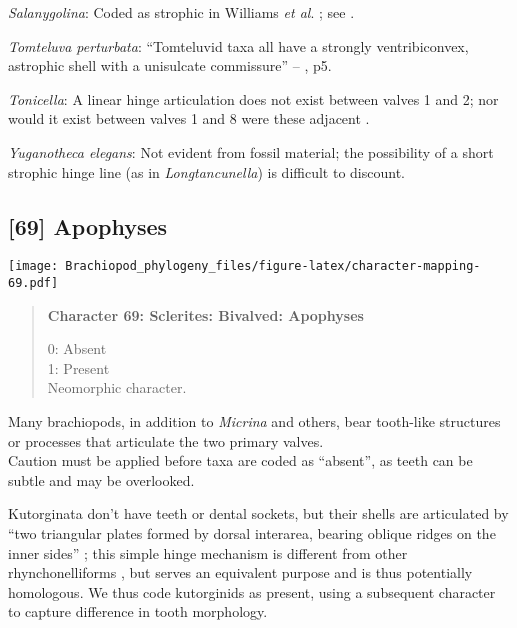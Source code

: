 \documentclass[openany]{book}
\theoremstyle{definition}
\theoremstyle{definition}
\theoremstyle{definition}
\theoremstyle{remark}
\begin{document}
\hypertarget{Salanygolina-coding-68}{}
\emph{Salanygolina}: Coded as strophic in Williams \emph{et al}.
\citeyearpar{Williams1998Thediversity}; see
\citet{Holmer2009Theenigmatic}.

\hypertarget{Tomteluva_perturbata-coding-68}{}
\emph{Tomteluva perturbata}: ``Tomteluvid taxa all have a strongly
ventribiconvex, astrophic shell with a unisulcate commissure'' --
\citet{Streng2016Anew}, p5.

\hypertarget{Tonicella-coding-68}{}
\emph{Tonicella}: A linear hinge articulation does not exist between
valves 1 and 2; nor would it exist between valves 1 and 8 were these
adjacent \citep{Connors2012}.

\hypertarget{Yuganotheca_elegans-coding-68}{}
\emph{Yuganotheca elegans}: Not evident from fossil material; the
possibility of a short strophic hinge line (as in \emph{Longtancunella})
is difficult to discount.

\subsection*{{[}69{]} Apophyses}\label{apophyses}

\texttt{[image: Brachiopod\_phylogeny\_files/figure-latex/character-mapping-69.pdf]}

\begin{quote}
\textbf{Character 69: Sclerites: Bivalved: Apophyses}

0: Absent\\
1: Present\\
Neomorphic character.
\end{quote}

Many brachiopods, in addition to \emph{Micrina} and others, bear
tooth-like structures or processes that articulate the two primary
valves.\\
Caution must be applied before taxa are coded as ``absent'', as teeth
can be subtle and may be overlooked.

Kutorginata don't have teeth or dental sockets, but their shells are
articulated by ``two triangular plates formed by dorsal interarea,
bearing oblique ridges on the inner sides''
\citep[p.~211]{Williams2000LinguliformeaCraniiformea}; this simple hinge
mechanism is different from other rhynchonelliforms
\citep[p.208]{Williams2000LinguliformeaCraniiformea}, but serves an
equivalent purpose and is thus potentially homologous. We thus code
kutorginids as present, using a subsequent character to capture
difference in tooth morphology.
\end{document}
